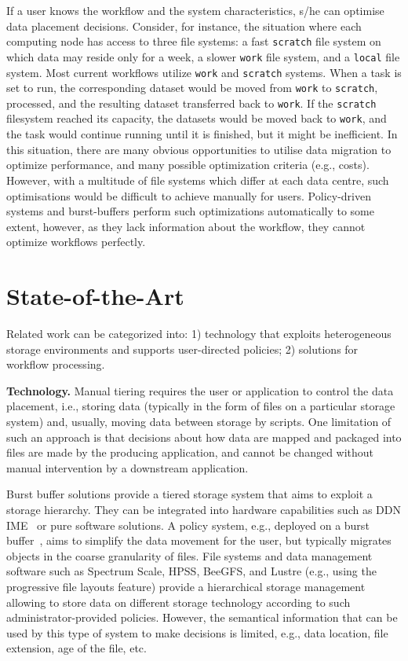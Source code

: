\documentclass{superfri}
\begin{document}
If a user knows the workflow and the system characteristics, s/he can optimise data placement decisions.
Consider, for instance, the situation where each computing node has access to three file systems: a fast \texttt{scratch} file system on which data may reside only for a week, a slower \texttt{work} file system, and a \texttt{local} file system.
Most current workflows utilize \texttt{work} and \texttt{scratch} systems.
When a task is set to run, the corresponding dataset would be moved from \texttt{work} to \texttt{scratch}, processed, and the resulting dataset transferred back to \texttt{work}.
If the \texttt{scratch} filesystem reached its capacity, the datasets would be moved back to \texttt{work}, and the task would continue running until it is finished, but it might be inefficient. %
In this situation, there are many obvious opportunities to utilise data migration to optimize performance, and many possible optimization criteria (e.g., costs).
However, with a multitude of file systems which differ at each data centre, such optimisations would be difficult to achieve manually for users.
Policy-driven systems and burst-buffers perform such optimizations automatically to some extent, however, as they lack information about the workflow, they cannot optimize workflows perfectly.

\section{State-of-the-Art}

Related work can be categorized into:
1) technology that exploits heterogeneous storage environments and supports user-directed policies;
2) solutions for workflow processing.

\textbf{Technology.}
Manual tiering requires the user or application to control the data placement, i.e., storing data (typically in the form of files on a particular storage system) and, usually, moving data between storage by scripts.
One limitation of such an approach is that decisions about how data are mapped and packaged into files are made by the producing application, and cannot be changed without manual intervention by a downstream application.

Burst buffer solutions provide a tiered storage system that aims to exploit a storage hierarchy.
They can be integrated into hardware capabilities such as DDN IME~\cite{BODIAIFSFI19} or pure software solutions.
A policy system, e.g., deployed on a burst buffer~\cite{RomanusRP15}, aims to simplify the data movement for the user, but typically migrates objects in the coarse granularity of files.
File systems and data management software such as Spectrum Scale, HPSS, BeeGFS, and Lustre (e.g., using the progressive file layouts feature) provide a hierarchical storage management allowing to store data on different storage technology according to such administrator-provided policies.
However, the semantical information that can be used by this type of system to make decisions is limited, e.g., data location, file extension, age of the file, etc.
\end{document}
